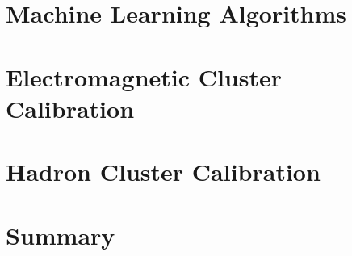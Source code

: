 \documentclass
[
]
{thesis}
\begin{document}
\chapter{Machine Learning Algorithms}
\label{chapter:ch3}

\chapter{Electromagnetic Cluster Calibration}
\label{chapter:ch4}

\chapter{Hadron Cluster Calibration}

\chapter{Summary}




%

%

%




\end{document}
